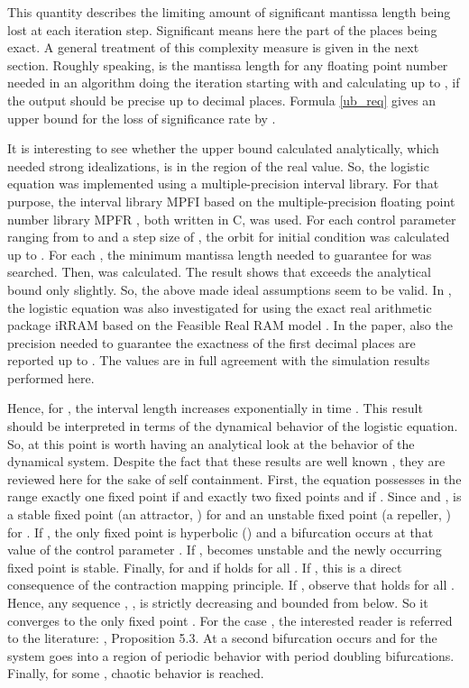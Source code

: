 \documentclass[copyright,creativecommons]{eptcs}
\theoremstyle{definition}
\begin{document}
This quantity describes the limiting amount of significant mantissa length
being lost at each iteration step. Significant means here the part of
the places being exact. A general treatment of this complexity measure
is given in the next section. Roughly speaking,
 is the mantissa length
for any floating point number needed in an algorithm doing the iteration
starting with  and calculating up to , if the output should be precise
up to  decimal places. Formula \ref{ub_req} gives an upper
bound for the loss of significance rate by
.

It is interesting to see whether the upper bound calculated analytically,
which needed strong idealizations, is in the region of the real value.
So, the logistic equation was implemented using a multiple-precision
interval library. For that purpose, the interval library MPFI
\cite{ReRo02} based on the multiple-precision floating point number
library MPFR \cite{Fousse:2007:MMP}, both written in C, was used.
For each control parameter  ranging from  to  and a
step size of , the orbit for initial condition  was
calculated up to . For each , the minimum
mantissa length  needed to guarantee 
for  was searched. Then, 
was calculated. The result shows that  exceeds the
analytical bound  only slightly. So, the above made
ideal assumptions seem to be valid. In \cite{Mue01}, the logistic
equation was also investigated for  using the exact real
arithmetic package iRRAM based on the Feasible Real RAM model
\cite{BH98}. In the paper, also the precision needed
to guarantee the exactness of the first  decimal places
are reported up to . The values are in full
agreement with the simulation results performed here.

Hence, for , the interval length 
increases exponentially in time . This result should be interpreted
in terms of the dynamical behavior of the logistic equation. So, at
this point is worth having an analytical look at the behavior
of the dynamical system. Despite the fact that these results
are well known \cite{hsd04, de89}, they are reviewed here for the sake of
self containment. First, the equation possesses in the range 
exactly one
fixed point  if  and exactly two fixed points 
and  if . Since 
and ,  is a stable fixed point (an attractor,
) for  and an unstable fixed point
(a repeller, ) for .
If , the only fixed point  is hyperbolic ()
and a bifurcation occurs at that value of the control parameter .
If ,  becomes unstable
and the newly occurring fixed point  is stable. Finally,
 for  and
 if  holds for all .
If , this is a direct consequence
of the contraction mapping principle. If , observe that
 holds for all . Hence, any sequence ,
, is strictly decreasing and bounded from below. So it
converges to the only fixed point . For the case ,
the interested reader is referred to the literature: \cite{de89},
Proposition 5.3. At  a second bifurcation occurs
and for  the system goes into a region of periodic
behavior with period doubling bifurcations. Finally, for some
, chaotic behavior is reached.
\end{document}
